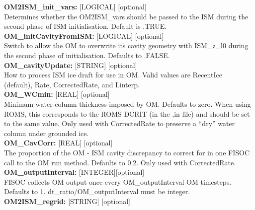 \documentclass[11pt]{article}
\begin{document}
\begin{flushleft}
\vspace{6pt}
\textbf{OM2ISM\_init\_vars:}  [LOGICAL] [optional]                         \\
Determines whether the OM2ISM\_vars should be passed to the ISM during the 
second phase of ISM initialisation.   Default is .TRUE.                    \\ 
\vspace{6pt}
\textbf{OM\_initCavityFromISM:}  [LOGICAL] [optional]                      \\
Switch to allow the OM to overwrite its cavity geometry with ISM\_z\_l0 
during the second phase of initialisation.
Defaults to .FALSE.                                                        \\
\vspace{6pt}
\textbf{OM\_cavityUpdate:}   [STRING] [optional]                           \\
How to process ISM ice draft for use in OM.  Valid values are RecentIce    \\
(default), Rate, CorrectedRate, and Linterp.                               \\
\vspace{6pt}
\textbf{OM\_WCmin:}  [REAL] [optional]                                     \\
Minimum water column thickness imposed by OM.  Defaults to zero.  When 
using ROMS, this corresponds to the ROMS DCRIT (in the ,in file) and 
should be set to the same value.  Only used with CorrectedRate to 
preserve a ``dry'' water column under grounded ice.                        \\
\vspace{6pt}
\textbf{OM\_CavCorr:}  [REAL] [optional]                                   \\
The proportion of the OM - ISM cavity discrepancy to correct for in one 
FISOC call to the  OM run method.  Defaults to 0.2.  Only used with 
CorrectedRate.                                                             \\
\vspace{6pt}
\textbf{OM\_outputInterval:} [INTEGER][optional]                           \\
FISOC collects OM output once every OM\_outputInterval OM timesteps. 
Defaults to 1.  dt\_ratio/OM\_outputInterval must be integer.              \\
\vspace{6pt}
\textbf{OM2ISM\_regrid:}       [STRING] [optional]                         \\

\end{flushleft}
\end{document}
